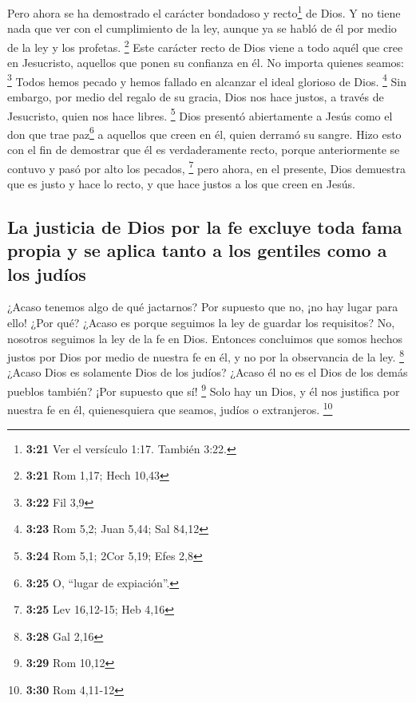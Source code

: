  Pero ahora se ha demostrado el carácter bondadoso y
recto\footnote{\textbf{3:21} Ver el versículo 1:17. También 3:22.} de
Dios. Y no tiene nada que ver con el cumplimiento de la ley, aunque ya
se habló de él por medio de la ley y los profetas. \footnote{\textbf{3:21}
  Rom 1,17; Hech 10,43}  Este carácter recto de Dios
viene a todo aquél que cree en Jesucristo, aquellos que ponen su
confianza en él. No importa quienes seamos: \footnote{\textbf{3:22} Fil
  3,9}  Todos hemos pecado y hemos fallado en alcanzar el
ideal glorioso de Dios. \footnote{\textbf{3:23} Rom 5,2; Juan 5,44; Sal
  84,12}  Sin embargo, por medio del regalo de su gracia,
Dios nos hace justos, a través de Jesucristo, quien nos hace libres.
\footnote{\textbf{3:24} Rom 5,1; 2Cor 5,19; Efes 2,8} 
Dios presentó abiertamente a Jesús como el don que trae paz\footnote{\textbf{3:25}
  O, ``lugar de expiación''.} a aquellos que creen en él, quien derramó
su sangre. Hizo esto con el fin de demostrar que él es verdaderamente
recto, porque anteriormente se contuvo y pasó por alto los pecados,
\footnote{\textbf{3:25} Lev 16,12-15; Heb 4,16}  pero
ahora, en el presente, Dios demuestra que es justo y hace lo recto, y
que hace justos a los que creen en Jesús.

\hypertarget{la-justicia-de-dios-por-la-fe-excluye-toda-fama-propia-y-se-aplica-tanto-a-los-gentiles-como-a-los-juduxedos}{%
\subsection{La justicia de Dios por la fe excluye toda fama propia y se
aplica tanto a los gentiles como a los
judíos}\label{la-justicia-de-dios-por-la-fe-excluye-toda-fama-propia-y-se-aplica-tanto-a-los-gentiles-como-a-los-juduxedos}}

 ¿Acaso tenemos algo de qué jactarnos? Por supuesto que
no, ¡no hay lugar para ello! ¿Por qué? ¿Acaso es porque seguimos la ley
de guardar los requisitos? No, nosotros seguimos la ley de la fe en
Dios.  Entonces concluimos que somos hechos justos por
Dios por medio de nuestra fe en él, y no por la observancia de la ley.
\footnote{\textbf{3:28} Gal 2,16}  ¿Acaso Dios es
solamente Dios de los judíos? ¿Acaso él no es el Dios de los demás
pueblos también? ¡Por supuesto que sí! \footnote{\textbf{3:29} Rom 10,12}
 Solo hay un Dios, y él nos justifica por nuestra fe en
él, quienesquiera que seamos, judíos o extranjeros. \footnote{\textbf{3:30}
  Rom 4,11-12}


